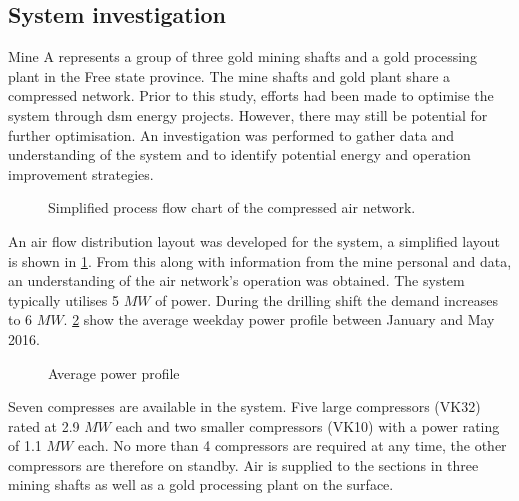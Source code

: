 \subsection{System investigation}
Mine A represents a group of three gold mining shafts and a gold processing plant in the Free state province. The mine shafts and gold plant share a compressed network. Prior to this study, efforts had been made to optimise the system through \gls{dsm} energy projects. However, there may still be potential for further optimisation. An investigation was performed to gather data and understanding of the system and to identify potential energy and operation improvement strategies.
\par 
\begin{figure}[h!]
	\centering
	\caption{Simplified process flow chart of the compressed air network.}
	\label{fig: Beatrix Air layout}
\end{figure}
An air flow distribution layout was developed for the system, a simplified layout is shown in \cref{fig: Beatrix Air layout}. From this along with information from the mine personal and data, an understanding of the air network's operation was obtained. The system typically utilises 5 $MW$ of power. During the drilling shift the demand increases to 6 $MW$. \cref{fig: Beatrix power baseline} show the average weekday power profile between January and May 2016.
\begin{figure}[h!]
	\centering
	
	\caption{Average power profile}
	\label{fig: Beatrix power baseline}
\end{figure}
\par 
 Seven compresses are available in the system. Five large compressors (VK32) rated at 2.9 $MW$ each and two smaller compressors (VK10) with a power rating of 1.1 $MW$ each. No more than 4 compressors are required at any time, the other compressors are therefore on standby. Air is supplied to the sections in three mining shafts as well as a gold processing plant on the surface. 

